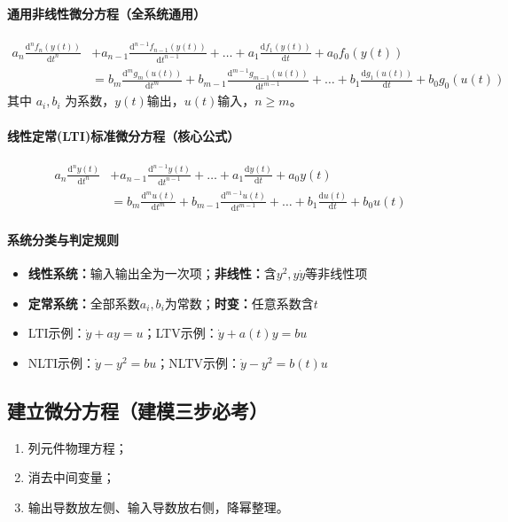 \paragraph{通用非线性微分方程（全系统通用）}
\[
\begin{split}
a_n \frac{\mathrm{d}^n f_n(y(t))}{\mathrm{d}t^n} &+ a_{n-1} \frac{\mathrm{d}^{n-1} f_{n-1}(y(t))}{\mathrm{d}t^{n-1}} + \dots + a_1 \frac{\mathrm{d} f_1(y(t))}{\mathrm{d}t} + a_0 f_0(y(t)) \\
&= b_m \frac{\mathrm{d}^m g_m(u(t))}{\mathrm{d}t^m} + b_{m-1} \frac{\mathrm{d}^{m-1} g_{m-1}(u(t))}{\mathrm{d}t^{m-1}} + \dots + b_1 \frac{\mathrm{d} g_1(u(t))}{\mathrm{d}t} + b_0 g_0(u(t))
\end{split}
\]
其中 $a_i,b_i$ 为系数，$y(t)$输出，$u(t)$输入，$n\ge m$。

\medskip

\paragraph{线性定常(LTI)标准微分方程（核心公式）}
\[
\begin{split}
a_n \frac{\mathrm{d}^n y(t)}{\mathrm{d}t^n} &+ a_{n-1} \frac{\mathrm{d}^{n-1} y(t)}{\mathrm{d}t^{n-1}} + \dots + a_1 \frac{\mathrm{d}y(t)}{\mathrm{d}t} + a_0 y(t) \\
&= b_m \frac{\mathrm{d}^m u(t)}{\mathrm{d}t^m} + b_{m-1} \frac{\mathrm{d}^{m-1} u(t)}{\mathrm{d}t^{m-1}} + \dots + b_1 \frac{\mathrm{d}u(t)}{\mathrm{d}t} + b_0 u(t)
\end{split}
\]

\medskip

\paragraph{系统分类与判定规则}
\begin{itemize}
    \item \textbf{线性系统：}输入输出全为一次项；\textbf{非线性：}含$y^2,y\dot y$等非线性项
    \item \textbf{定常系统：}全部系数$a_i,b_i$为常数；\textbf{时变：}任意系数含$t$
    \item LTI示例：$\dot y+ay=u$；LTV示例：$\dot y+a(t)y=bu$
    \item NLTI示例：$\dot y-y^2=bu$；NLTV示例：$\dot y-y^2=b(t)u$
\end{itemize}

\subsection{建立微分方程（建模三步必考）}
\begin{enumerate}
    \item 列元件物理方程；\item 消去中间变量；\item 输出导数放左侧、输入导数放右侧，降幂整理。
\end{enumerate}

